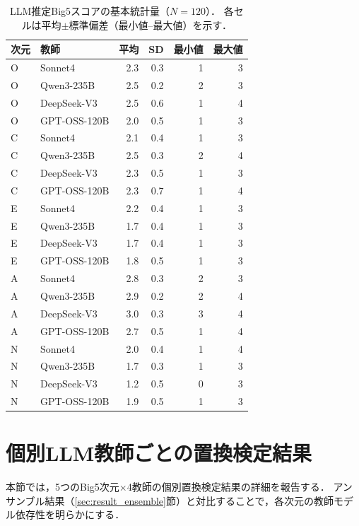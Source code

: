 \documentclass[dvipdfmx,11pt,a4paper]{bxjsarticle}
\begin{document}
\begin{table}[htbp]
\centering
\caption{LLM推定Big5スコアの基本統計量（$N = 120$）．
各セルは平均$\pm$標準偏差（最小値--最大値）を示す．}
\label{tab:score_stats}
\begin{tabular}{llrrrr}
\toprule
次元 & 教師 & 平均 & SD & 最小値 & 最大値 \\
\midrule
O & Sonnet4       & 2.3 & 0.3 & 1 & 3 \\
O & Qwen3-235B    & 2.5 & 0.2 & 2 & 3 \\
O & DeepSeek-V3   & 2.5 & 0.6 & 1 & 4 \\
O & GPT-OSS-120B  & 2.0 & 0.5 & 1 & 3 \\
\midrule
C & Sonnet4       & 2.1 & 0.4 & 1 & 3 \\
C & Qwen3-235B    & 2.5 & 0.3 & 2 & 4 \\
C & DeepSeek-V3   & 2.3 & 0.5 & 1 & 3 \\
C & GPT-OSS-120B  & 2.3 & 0.7 & 1 & 4 \\
\midrule
E & Sonnet4       & 2.2 & 0.4 & 1 & 3 \\
E & Qwen3-235B    & 1.7 & 0.4 & 1 & 3 \\
E & DeepSeek-V3   & 1.7 & 0.4 & 1 & 3 \\
E & GPT-OSS-120B  & 1.8 & 0.5 & 1 & 3 \\
\midrule
A & Sonnet4       & 2.8 & 0.3 & 2 & 3 \\
A & Qwen3-235B    & 2.9 & 0.2 & 2 & 4 \\
A & DeepSeek-V3   & 3.0 & 0.3 & 3 & 4 \\
A & GPT-OSS-120B  & 2.7 & 0.5 & 1 & 4 \\
\midrule
N & Sonnet4       & 2.0 & 0.4 & 1 & 4 \\
N & Qwen3-235B    & 1.7 & 0.3 & 1 & 3 \\
N & DeepSeek-V3   & 1.2 & 0.5 & 0 & 3 \\
N & GPT-OSS-120B  & 1.9 & 0.5 & 1 & 3 \\
\bottomrule
\end{tabular}
\end{table}



\section{個別LLM教師ごとの置換検定結果}
\label{sec:appendix_individual_teacher}

本節では，5つのBig5次元$\times$4教師の個別置換検定結果の詳細を報告する．
アンサンブル結果（\ref{sec:result_ensemble}節）と対比することで，各次元の教師モデル依存性を明らかにする．
\end{document}
